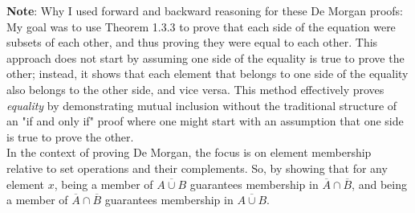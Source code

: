 
\newpage

    \textbf{Note}: Why I used forward and backward reasoning for these De Morgan proofs: \\

    My goal was to use Theorem 1.3.3 to prove that each side of the equation were subsets of each other, and thus proving they were equal to each other. This approach does not start by assuming one side of the equality is true to prove the other; instead, it shows that each element that belongs to one side of the equality also belongs to the other side, and vice versa. This method effectively proves \textit{equality} by demonstrating mutual inclusion without the traditional structure of an "if and only if" proof where one might start with an assumption that one side is true to prove the other. \\

    In the context of proving De Morgan, the focus is on element membership relative to set operations and their complements. So, by showing that for any element \(x\), being a member of \(\overline{A\cup B}\) guarantees membership in \(\overline{A} \cap \overline{B}\), and being a member of \(\overline{A} \cap \overline{B}\) guarantees membership in \(\overline{A\cup B}\). \\

